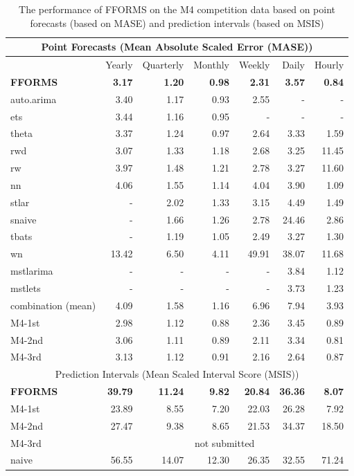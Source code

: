 \documentclass[11pt,a4paper,]{article}
\begin{document}
\begin{table}[!h]
\centering\scriptsize\tabcolsep=0.12cm
\caption{The performance of FFORMS on the M4 competition data based on point forecasts (based on MASE) and prediction intervals (based on MSIS)}
\label{forecasts}
\begin{tabular}{l|rrrrrr}
\hline
\multicolumn{7}{c}{Point Forecasts (Mean Absolute Scaled Error (MASE))} \\\hline
 & Yearly & Quarterly & Monthly & Weekly & Daily & Hourly \\\hline
\bf{FFORMS} & \bf{3.17} &  \bf{1.20} &  \bf{0.98}&  \bf{2.31}& \bf{3.57} &  \bf{0.84}\\
auto.arima & 3.40 &1.17  &0.93  & 2.55 &  -& - \\
ets & 3.44 &  1.16& 0.95 &  -&-  &  -\\
theta & 3.37 &1.24  & 0.97 &2.64  & 3.33 & 1.59 \\
rwd & 3.07 & 1.33 & 1.18  & 2.68  & 3.25 & 11.45 \\
rw & 3.97 & 1.48 & 1.21  &2.78  & 3.27 & 11.60 \\
nn & 4.06 & 1.55 &  1.14 &4.04 & 3.90 & 1.09 \\
stlar & - & 2.02 &  1.33& 3.15 & 4.49 & 1.49 \\
snaive & - &  1.66& 1.26 &  2.78& 24.46 & 2.86 \\
tbats & - & 1.19 &  1.05& 2.49 & 3.27 &  1.30\\
wn & 13.42 &  6.50&  4.11&  49.91& 38.07 & 11.68 \\
mstlarima & - & - &  - & - & 3.84 &  1.12\\
mstlets & - &  - &  - &  - & 3.73 &  1.23\\
combination (mean) & 4.09 & 1.58 &  1.16&6.96  & 7.94 & 3.93 \\\hline
M4-1st & 2.98 & 1.12 &  0.88& 2.36 & 3.45 & 0.89\\
M4-2nd & 3.06 & 1.11 &  0.89& 2.11 & 3.34 & 0.81\\
M4-3rd & 3.13 & 1.12 &  0.91& 2.16 & 2.64 & 0.87\\\hline
\multicolumn{7}{c}{Prediction Intervals (Mean Scaled Interval Score (MSIS))} \\\hline
\bf{FFORMS} & \bf{39.79} &  \bf{11.24} &  \bf{9.82}&  \bf{20.84}& \bf{36.36} & \bf{8.07} \\
M4-1st & 23.89 & 8.55 &  7.20 & 22.03 & 26.28 & 7.92\\
M4-2nd & 27.47 & 9.38 &  8.65& 21.53 & 34.37 & 18.50\\
M4-3rd & \multicolumn{6}{c}{not submitted}\\
naive & 56.55 & 14.07 &  12.30 & 26.35 & 32.55 & 71.24\\\hline
\end{tabular}
\end{table}
\end{document}
